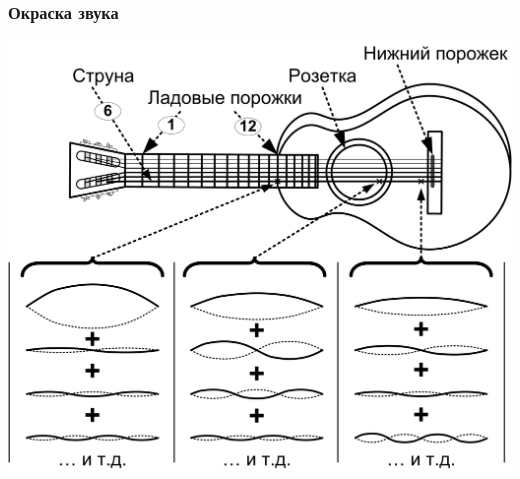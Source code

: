 \appendix

\begin{frame}
    \frametitle{Окраска звука}

    \begin{center}
        \includegraphics[width=.6\textwidth]{figs/obertone-color}
    \end{center}
\end{frame}

